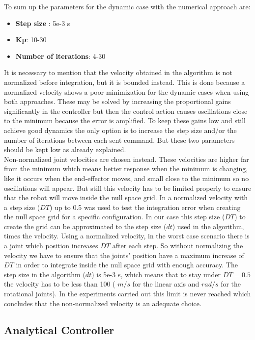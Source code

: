 To sum up the parameters for the dynamic case with the numerical approach are:
 \begin{itemize}  
 	\item \textbf{Step size} : 5e-3 s
 	\item \textbf{Kp}: 10-30
    \item \textbf{Number of iterations}: 4-30
  \end{itemize} 
 
It is necessary to mention that the velocity obtained in the algorithm is not normalized before  integration, but it is bounded instead. This is done because a normalized velocity shows a poor minimization for the dynamic cases when using both approaches. These may be solved by increasing the proportional gains significantly in the controller but then the control action causes oscillations close to the minimum because the error is  amplified. To keep these gains low and still achieve good dynamics the only option is to increase the step size and/or the number of iterations between each sent command. But these two parameters should be kept low as already explained. \\
Non-normalized joint velocities are chosen instead. These velocities are higher far from the minimum which means better response when the minimum is changing, like it occurs when the end-effector moves, and small close to the minimum so no oscillations will appear. But still this velocity has to be limited properly to ensure that the robot will move inside the null space grid.  In \cite{fabianthesis} a normalized velocity with a step size ($DT$) up to 0.5 was used to test the integration error when creating the null space grid for a specific configuration. 
In our case this step size ($DT$) to create the grid can be approximated to the step size ($dt$) used in the algorithm, times the velocity. Using a normalized velocity, in the worst case scenario there is a joint which position increases $DT$ after each step. So without normalizing the velocity we have to ensure that the joints' position have a maximum increase of $DT$ in order to integrate inside the null space grid with enough accuracy.
The step size in the algorithm ($dt$) is 5e-3 s, which means that to stay under $DT=0.5$ the velocity has to be less than 100 ( $m/s$ for the linear axis and $rad/s$ for the rotational joints). In the experiments carried out this limit is never reached which concludes that the non-normalized velocity is an adequate choice. 


\subsection{Analytical Controller}

